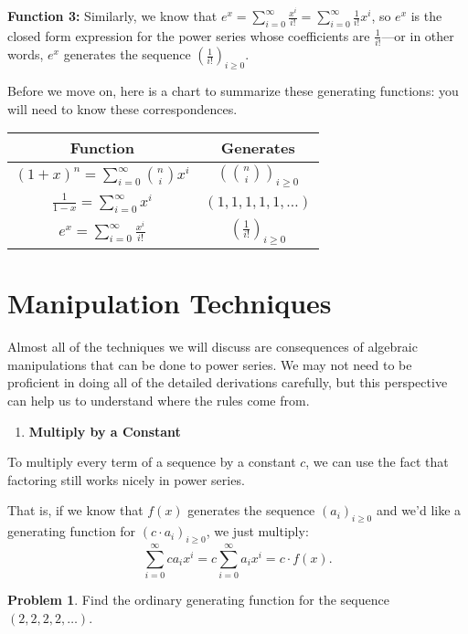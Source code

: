\documentclass{article}
\theoremstyle{definition}
\newtheorem{problem}{Problem}
\begin{document}
\textbf{Function 3:} Similarly, we know that $e^{x}=\sum_{i=0}^{\infty} \frac{x^{i}}{i!}=\sum_{i=0}^{\infty} \frac{1}{i!} x^{i}$, so $e^{x}$ is the closed form expression for the power series whose coefficients are $\frac{1}{i!}$---or in other words, $e^{x}$ generates the sequence $\left(\frac{1}{i!}\right)_{i \geq 0}$.

Before we move on, here is a chart to summarize these generating functions: you will need to know these correspondences.

\begin{center}
\begin{tabular}{|c|c|}
\hline
\textbf{Function} & \textbf{Generates} \\
\hline
$(1+x)^{n} = \sum_{i=0}^{\infty}\binom{n}{i} x^{i}$ & $\left(\binom{n}{i}\right)_{i \geq 0}$ \\
\hline
$\frac{1}{1-x} = \sum_{i=0}^{\infty} x^{i}$ & $(1,1,1,1,1, \ldots)$ \\
\hline
$e^{x} = \sum_{i=0}^{\infty} \frac{x^{i}}{i!}$ & $\left(\frac{1}{i!}\right)_{i \geq 0}$ \\
\hline
\end{tabular}
\end{center}

\section*{Manipulation Techniques}
Almost all of the techniques we will discuss are consequences of algebraic manipulations that can be done to power series. We may not need to be proficient in doing all of the detailed derivations carefully, but this perspective can help us to understand where the rules come from.

\begin{enumerate}
  \item \textbf{Multiply by a Constant}
\end{enumerate}

To multiply every term of a sequence by a constant $c$, we can use the fact that factoring still works nicely in power series.

That is, if we know that $f(x)$ generates the sequence $\left(a_{i}\right)_{i \geq 0}$ and we'd like a generating function for $\left(c \cdot a_{i}\right)_{i \geq 0}$, we just multiply:
\[\sum_{i=0}^{\infty} c a_{i} x^{i}=c \sum_{i=0}^{\infty} a_{i} x^{i}=c \cdot f(x).\]

\begin{problem}
Find the ordinary generating function for the sequence $(2,2,2,2, \ldots)$.
\end{problem}
\end{document}
